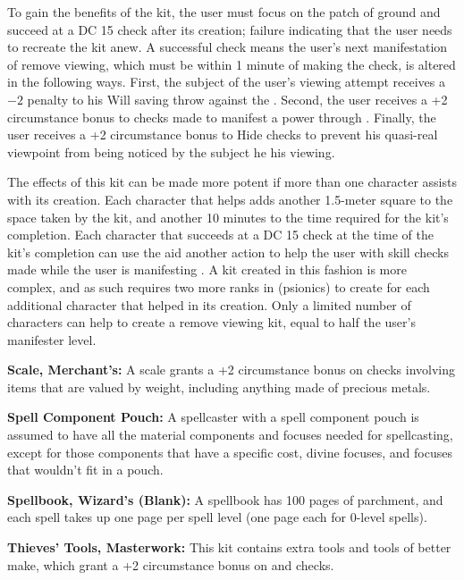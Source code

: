 To gain the benefits of the kit, the user must focus on the patch of ground and succeed at a DC 15  check after its creation; failure indicating that the user needs to recreate the kit anew. A successful check means the user's next manifestation of remove viewing, which must be within 1 minute of making the check, is altered in the following ways. First, the subject of the user's viewing attempt receives a $-2$ penalty to his Will saving throw against the . Second, the user receives a +2 circumstance bonus to  checks made to manifest a power through . Finally, the user receives a +2 circumstance bonus to Hide checks to prevent his quasi-real viewpoint from being noticed by the subject he his viewing.

The effects of this kit can be made more potent if more than one character assists with its creation. Each character that helps adds another 1.5-meter square to the space taken by the kit, and another 10 minutes to the time required for the kit's completion. Each character that succeeds at a DC 15  check at the time of the kit's completion can use the aid another action to help the user with skill checks made while the user is manifesting . A kit created in this fashion is more complex, and as such requires two more ranks in  (psionics) to create for each additional character that helped in its creation. Only a limited number of characters can help to create a remove viewing kit, equal to half the user's manifester level.

\textbf{Scale, Merchant's:} A scale grants a +2 circumstance bonus on  checks involving items that are valued by weight, including anything made of precious metals.

\textbf{Spell Component Pouch:} A spellcaster with a spell component pouch is assumed to have all the material components and focuses needed for spellcasting, except for those components that have a specific cost, divine focuses, and focuses that wouldn't fit in a pouch.

\textbf{Spellbook, Wizard's (Blank):} A spellbook has 100 pages of parchment, and each spell takes up one page per spell level (one page each for 0-level spells).

\textbf{Thieves' Tools, Masterwork:} This kit contains extra tools and tools of better make, which grant a +2 circumstance bonus on  and  checks.

